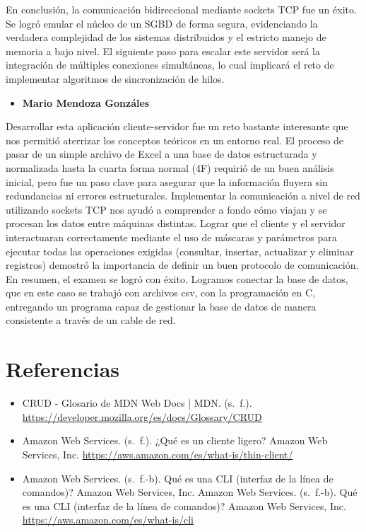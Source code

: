 \documentclass[12pt]{article}
\begin{document}
En conclusión, la comunicación bidireccional mediante sockets TCP fue un éxito. Se logró emular el núcleo de un SGBD de forma segura, evidenciando la verdadera complejidad de los sistemas distribuidos y el estricto manejo de memoria a bajo nivel. El siguiente paso para escalar este servidor será la integración de múltiples conexiones simultáneas, lo cual implicará el reto de implementar algoritmos de sincronización de hilos.

\begin{itemize}
    \item \textbf{Mario Mendoza Gonzáles}
\end{itemize}

Desarrollar esta aplicación cliente-servidor fue un reto bastante interesante que nos permitió aterrizar los conceptos teóricos en un entorno real. El proceso de pasar de un simple archivo de Excel a una base de datos estructurada y normalizada hasta la cuarta forma normal (4F)  requirió de un buen análisis inicial, pero fue un paso clave para asegurar que la información fluyera sin redundancias ni errores estructurales.  Implementar la comunicación a nivel de red utilizando sockets TCP  nos ayudó a comprender a fondo cómo viajan y se procesan los datos entre máquinas distintas. Lograr que el cliente y el servidor interactuaran correctamente mediante el uso de máscaras y parámetros para ejecutar todas las operaciones exigidas (consultar, insertar, actualizar y eliminar registros)  demostró la importancia de definir un buen protocolo de comunicación. 
En resumen, el examen se logró con éxito. Logramos conectar la base de datos, que en este caso se trabajó con archivos csv, con la programación en C, entregando un programa capaz de gestionar la base de datos de manera consistente a través de un cable de red.

\section{Referencias}
\begin{itemize}
    \item CRUD - Glosario de MDN Web Docs | MDN. (s. f.). \url{https://developer.mozilla.org/es/docs/Glossary/CRUD}
    \item Amazon Web Services. (s. f.). ¿Qué es un cliente ligero? Amazon Web Services, Inc. \url{https://aws.amazon.com/es/what-is/thin-client/}
    \item Amazon Web Services. (s. f.-b). Qué es una CLI (interfaz de la línea de comandos)? Amazon Web Services, Inc. Amazon Web Services. (s. f.-b). Qué es una CLI (interfaz de la línea de comandos)? Amazon Web Services, Inc. \url {https://aws.amazon.com/es/what-is/cli}
\end{itemize}
\end{document}
